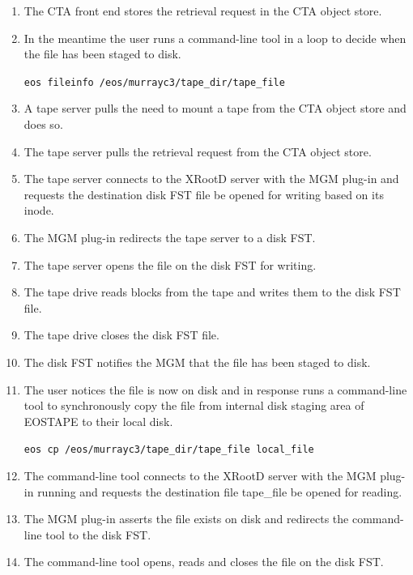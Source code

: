 \documentclass{article}
\begin{document}
\begin{enumerate}
\item The CTA front end stores the retrieval request in the CTA object store.

\item In the meantime the user runs a command-line tool in a loop to decide when the file has been staged to disk.

\texttt{eos fileinfo /eos/murrayc3/tape\_dir/tape\_file}

\item A tape server pulls the need to mount a tape from the CTA object store and does so.

\item The tape server pulls the retrieval request from the CTA object store.

\item The tape server connects to the XRootD server with the MGM plug-in and requests the destination disk FST file be opened for writing based on its inode.

\item The MGM plug-in redirects the tape server to a disk FST.

\item The tape server opens the file on the disk FST for writing.

\item The tape drive reads blocks from the tape and writes them to the disk FST file.

\item The tape drive closes the disk FST file.

\item The disk FST notifies the MGM that the file has been staged to disk.

\item The user notices the file is now on disk and in response runs a command-line tool to synchronously copy the file from internal disk staging area of EOSTAPE to their local disk.

\texttt{eos cp /eos/murrayc3/tape\_dir/tape\_file local\_file}

\item The command-line tool connects to the XRootD server with the MGM plug-in running and requests the destination file tape\_file be opened for reading.

\item The MGM plug-in asserts the file exists on disk and redirects the command-line tool to the disk FST.

\item The command-line tool opens, reads and closes the file on the disk FST.
\end{enumerate}
\end{document}
